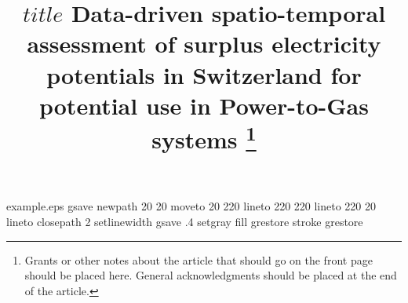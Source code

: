%
%
%
%
%
%
\begin{filecontents*}{example.eps}
gsave
newpath
  20 20 moveto
  20 220 lineto
  220 220 lineto
  220 20 lineto
closepath
2 setlinewidth
gsave
  .4 setgray fill
grestore
stroke
grestore
\end{filecontents*}
%
\RequirePackage{fix-cm}
%
\documentclass[twocolumn]{svjour3}          %
%


%
\usepackage{mathptmx}      %
%



%



%
%



\title{$title$ Data-driven spatio-temporal assessment of surplus electricity potentials in Switzerland for potential use in Power-to-Gas systems
	\thanks{Grants or other notes
about the article that should go on the front page should be
placed here. General acknowledgments should be placed at the end of the article.}
}

